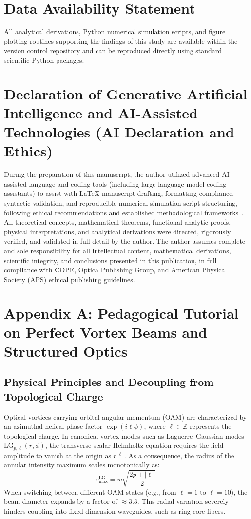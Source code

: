 \documentclass[11pt,a4paper]{article}
\begin{document}
\section*{Data Availability Statement}
All analytical derivations, Python numerical simulation scripts, and figure plotting routines supporting the findings of this study are available within the version control repository and can be reproduced directly using standard scientific Python packages.

\section*{Declaration of Generative Artificial Intelligence and AI-Assisted Technologies (AI Declaration and Ethics)}
During the preparation of this manuscript, the author utilized advanced AI-assisted language and coding tools (including large language model coding assistants) to assist with LaTeX manuscript drafting, formatting compliance, syntactic validation, and reproducible numerical simulation script structuring, following ethical recommendations and established methodological frameworks~\cite{Jauhiainen2026, Zhu2026PaperBanana, Haber2025}. All theoretical concepts, mathematical theorems, functional-analytic proofs, physical interpretations, and analytical derivations were directed, rigorously verified, and validated in full detail by the author. The author assumes complete and sole responsibility for all intellectual content, mathematical derivations, scientific integrity, and conclusions presented in this publication, in full compliance with COPE, Optica Publishing Group, and American Physical Society (APS) ethical publishing guidelines.

\appendix

\section{Appendix A: Pedagogical Tutorial on Perfect Vortex Beams and Structured Optics}
\label{app:primer}

\subsection{Physical Principles and Decoupling from Topological Charge}

Optical vortices carrying orbital angular momentum (OAM) are characterized by an azimuthal helical phase factor $\exp(i \ell \phi)$, where $\ell \in \mathbb{Z}$ represents the topological charge. In canonical vortex modes such as Laguerre--Gaussian modes $\text{LG}_{p, \ell}(r, \phi)$, the transverse scalar Helmholtz equation requires the field amplitude to vanish at the origin as $r^{|\ell|}$. As a consequence, the radius of the annular intensity maximum scales monotonically as:
\begin{equation}
r_{\max}^{\text{LG}} = w \sqrt{\frac{2p + |\ell|}{2}}.
\end{equation}
When switching between different OAM states (e.g., from $\ell=1$ to $\ell=10$), the beam diameter expands by a factor of $\approx 3.3$. This radial variation severely hinders coupling into fixed-dimension waveguides, such as ring-core fibers.
\end{document}
